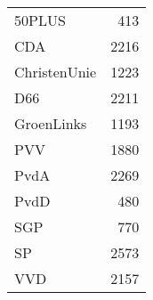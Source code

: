 \begin{tabular}{lr}
\toprule
50PLUS       &   413 \\
CDA          &  2216 \\
ChristenUnie &  1223 \\
D66          &  2211 \\
GroenLinks   &  1193 \\
PVV          &  1880 \\
PvdA         &  2269 \\
PvdD         &   480 \\
SGP          &   770 \\
SP           &  2573 \\
VVD          &  2157 \\
\bottomrule
\end{tabular}
